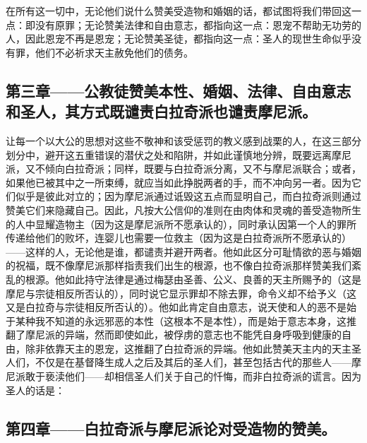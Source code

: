 在所有这一切中，无论他们说什么赞美受造物和婚姻的话，都试图将我们带回这一点：即没有原罪；无论赞美法律和自由意志，都指向这一点：恩宠不帮助无功劳的人，因此恩宠不再是恩宠；无论赞美圣徒，都指向这一点：圣人的现世生命似乎没有罪，他们不必祈求天主赦免他们的债务。\par


\subsection{第三章——公教徒赞美本性、婚姻、法律、自由意志和圣人，其方式既谴责白拉奇派也谴责摩尼派。}

让每一个以大公的思想对这些不敬神和该受惩罚的教义感到战栗的人，在这三部分划分中，避开这五重错误的潜伏之处和陷阱，并如此谨慎地分辨，既要远离摩尼派，又不倾向白拉奇派；同样，既要与白拉奇派分离，又不与摩尼派联合；或者，如果他已被其中之一所束缚，就应当如此挣脱两者的手，而不冲向另一者。因为它们似乎是彼此对立的；因为摩尼派通过诋毁这五点而显明自己，而白拉奇派则通过赞美它们来隐藏自己。因此，凡按大公信仰的准则在由肉体和灵魂的善受造物所生的人中显耀造物主（因为这是摩尼派所不愿承认的），同时承认因第一个人的罪所传递给他们的败坏，连婴儿也需要一位救主（因为这是白拉奇派所不愿承认的）——这样的人，无论他是谁，都谴责并避开两者。他如此区分可耻情欲的恶与婚姻的祝福，既不像摩尼派那样指责我们出生的根源，也不像白拉奇派那样赞美我们紊乱的根源。他如此持守法律是通过梅瑟由圣善、公义、良善的天主所赐予的（这是摩尼与宗徒相反所否认的），同时说它显示罪却不除去罪，命令义却不给予义（这又是白拉奇与宗徒相反所否认的）。他如此肯定自由意志，说天使和人的恶不是始于某种我不知道的永远邪恶的本性（这根本不是本性），而是始于意志本身，这推翻了摩尼派的异端，然而即使如此，被俘虏的意志也不能凭自身呼吸到健康的自由，除非依靠天主的恩宠，这推翻了白拉奇派的异端。他如此赞美天主内的天主圣人们，不仅是在基督降生成人之后及其后的圣人们，甚至包括古代的那些人——摩尼派敢于亵渎他们——却相信圣人们关于自己的忏悔，而非白拉奇派的谎言。因为圣人的话是： \par


\subsection{第四章——白拉奇派与摩尼派论对受造物的赞美。}

